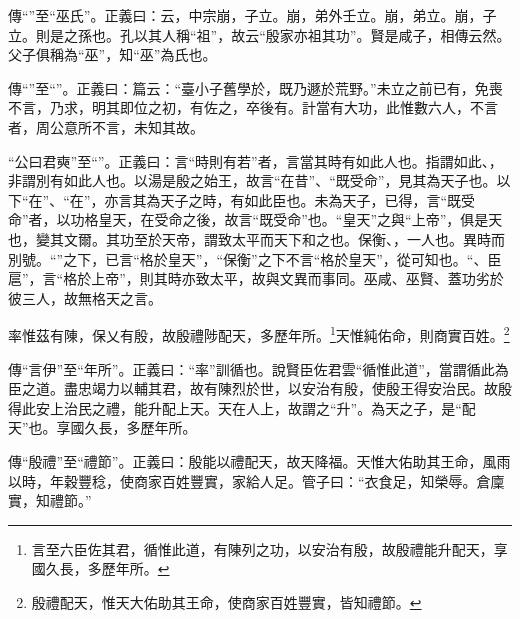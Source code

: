 {\noindent\zhuan{}\fzbyks 傳“”至“巫氏”。正義曰：云，中宗崩，子立。崩，弟外壬立。崩，弟立。崩，子立。則是之孫也。孔以其人稱“祖”，故云“殷家亦祖其功”。賢是咸子，相傳云然。父子俱稱為“巫”，知“巫”為氏也。 \par}

{\noindent\zhuan{}\fzbyks 傳“”至“”。正義曰：篇云：“臺小子舊學於，既乃遯於荒野。”未立之前已有，免喪不言，乃求，明其即位之初，有佐之，卒後有。計當有大功，此惟數六人，不言者，周公意所不言，未知其故。 \par}

{\noindent\shu{}\fzkt “公曰君奭”至“”。正義曰：言“時則有若”者，言當其時有如此人也。指謂如此、，非謂別有如此人也。以湯是殷之始王，故言“在昔”、“既受命”，見其為天子也。以下“在”、“在”，亦言其為天子之時，有如此臣也。未為天子，已得，言“既受命”者，以功格皇天，在受命之後，故言“既受命”也。“皇天”之與“上帝”，俱是天也，變其文爾。其功至於天帝，謂致太平而天下和之也。保衡、，一人也。異時而別號。“”之下，已言“格於皇天”，“保衡”之下不言“格於皇天”，從可知也。“、臣扈”，言“格於上帝”，則其時亦致太平，故與文異而事同。巫咸、巫賢、蓋功劣於彼三人，故無格天之言。 \par}

率惟茲有陳，保乂有殷，故殷禮陟配天，多歷年所。\footnote{言至六臣佐其君，循惟此道，有陳列之功，以安治有殷，故殷禮能升配天，享國久長，多歷年所。}天惟純佑命，則商實百姓。\footnote{殷禮配天，惟天大佑助其王命，使商家百姓豐實，皆知禮節。}


{\noindent\zhuan{}\fzbyks 傳“言伊”至“年所”。正義曰：“率”訓循也。說賢臣佐君雲“循惟此道”，當謂循此為臣之道。盡忠竭力以輔其君，故有陳烈於世，以安治有殷，使殷王得安治民。故殷得此安上治民之禮，能升配上天。天在人上，故謂之“升”。為天之子，是“配天”也。享國久長，多歷年所。 \par}

{\noindent\zhuan{}\fzbyks 傳“殷禮”至“禮節”。正義曰：殷能以禮配天，故天降福。天惟大佑助其王命，風雨以時，年穀豐稔，使商家百姓豐實，家給人足。管子曰：“衣食足，知榮辱。倉廩實，知禮節。” \par}


